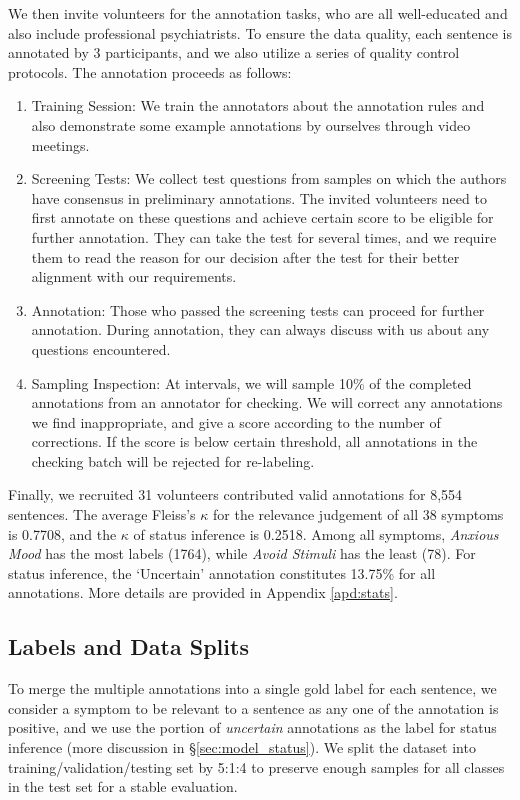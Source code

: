 We then invite volunteers for the annotation tasks, who are all well-educated and also include professional psychiatrists. To ensure the data quality, each sentence is annotated by 3 participants, and we also utilize a series of quality control protocols. The annotation proceeds as follows: 
\begin{enumerate}
    \item Training Session: We train the annotators about the annotation rules and also demonstrate some example annotations by ourselves through video meetings.
    \item Screening Tests: We collect test questions from samples on which the authors have consensus in preliminary annotations. The invited volunteers need to first annotate on these questions and achieve certain score to be eligible for further annotation. They can take the test for several times, and we require them to read the reason for our decision after the test for their better alignment with our requirements.
    \item Annotation: Those who passed the screening tests can proceed for further annotation. During annotation, they can always discuss with us about any questions encountered.
    \item Sampling Inspection: At intervals, we will sample 10\% of the completed annotations from an annotator for checking. We will correct any annotations we find inappropriate, and give a score according to the number of corrections. If the score is below certain threshold, all annotations in the checking batch will be rejected for re-labeling.
\end{enumerate}

Finally, we recruited 31 volunteers contributed valid annotations for 8,554 sentences. The average Fleiss's $\kappa$ for the relevance judgement of all 38 symptoms is 0.7708, and the $\kappa$ of status inference is 0.2518. Among all symptoms, \textit{Anxious Mood} has the most labels (1764), while \textit{Avoid Stimuli} has the least (78). For status inference, the `Uncertain' annotation constitutes 13.75\% for all annotations. More details are provided in Appendix \ref{apd:stats}.

\subsection{Labels and Data Splits}

To merge the multiple annotations into a single gold label for each sentence, we consider a symptom to be relevant to a sentence as any one of the annotation is positive, and we use the portion of \textit{uncertain} annotations as the label for status inference (more discussion in \S \ref{sec:model_status}). We split the dataset into training/validation/testing set by 5:1:4 to preserve enough samples for all classes in the test set for a stable evaluation. 

